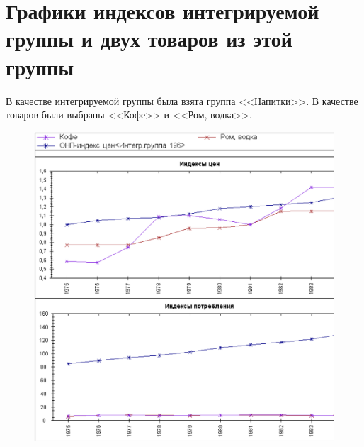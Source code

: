 \documentclass[12pt]{article}
\theoremstyle{rusdef}
\begin{document}
\section{Графики индексов интегрируемой группы и двух товаров из этой группы}
В качестве интегрируемой группы была взята группа <<Напитки>>. В качестве товаров были выбраны <<Кофе>> и <<Ром, водка>>.
\begin{figure}[h!]
	\centering
	\includegraphics[scale=0.6]{pics/pic1.eps}
	\caption{}
\end{figure}
\end{document}
